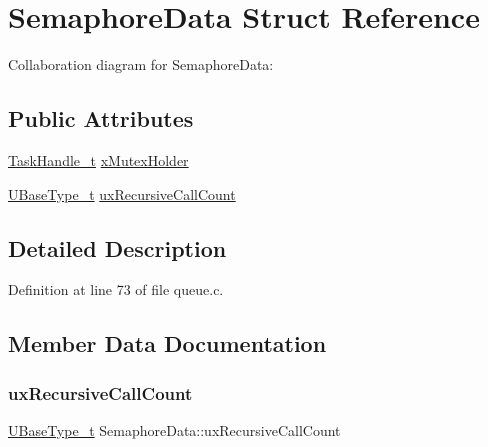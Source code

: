\hypertarget{struct_semaphore_data}{}\section{Semaphore\+Data Struct Reference}
\label{struct_semaphore_data}


Collaboration diagram for Semaphore\+Data\+:
\subsection*{Public Attributes}
\begin{DoxyCompactItemize}
\item 
\hyperlink{externals_2freertos_2include_2task_8h_a25b35e6e19ecf894173e7ff95edb96ef}{Task\+Handle\+\_\+t} \hyperlink{struct_semaphore_data_ab1ed54c7b39dc45b3c310fae7ad08693}{x\+Mutex\+Holder}
\item 
\hyperlink{externals_2freertos_2portable_2_g_c_c_2_a_r_m___c_m0_2portmacro_8h_a646f89d4298e4f5afd522202b11cb2e6}{U\+Base\+Type\+\_\+t} \hyperlink{struct_semaphore_data_aa428fcfc6e5831d054234444fde56574}{ux\+Recursive\+Call\+Count}
\end{DoxyCompactItemize}


\subsection{Detailed Description}


Definition at line 73 of file queue.\+c.



\subsection{Member Data Documentation}
\mbox{\label{struct_semaphore_data_aa428fcfc6e5831d054234444fde56574}} 
\subsubsection{\texorpdfstring{ux\+Recursive\+Call\+Count}{uxRecursiveCallCount}}
{\footnotesize\ttfamily \hyperlink{externals_2freertos_2portable_2_g_c_c_2_a_r_m___c_m0_2portmacro_8h_a646f89d4298e4f5afd522202b11cb2e6}{U\+Base\+Type\+\_\+t} Semaphore\+Data\+::ux\+Recursive\+Call\+Count}




